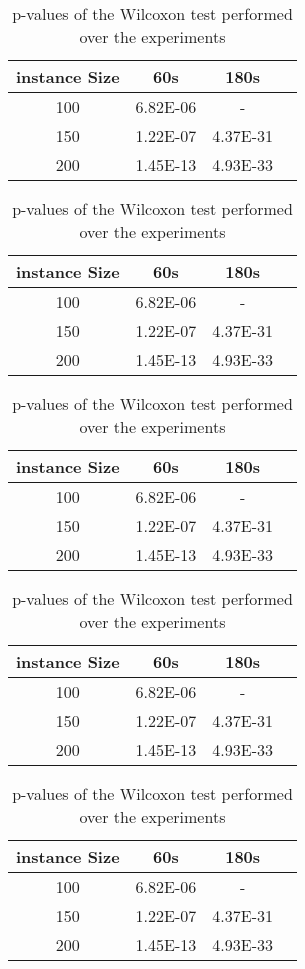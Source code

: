 \begin{table}[H]
\caption{p-values of the Wilcoxon test performed over the experiments}
\label{tab:wilcoxon}
\begin{tabular}{c ccc}
\toprule
instance Size & 60s & 180s \\
\midrule
100 & 6.82E-06 & - \\
150 & 1.22E-07 & 4.37E-31 \\
200 & 1.45E-13 & 4.93E-33 \\
\bottomrule
\end{tabular}
\end{table}
\begin{table}[H]
\caption{p-values of the Wilcoxon test performed over the experiments}
\label{tab:wilcoxon}
\begin{tabular}{c ccc}
\toprule
instance Size & 60s & 180s \\
\midrule
100 & 6.82E-06 & - \\
150 & 1.22E-07 & 4.37E-31 \\
200 & 1.45E-13 & 4.93E-33 \\
\bottomrule
\end{tabular}
\end{table}
\begin{table}[H]
\caption{p-values of the Wilcoxon test performed over the experiments}
\label{tab:wilcoxon}
\begin{tabular}{c ccc}
\toprule
instance Size & 60s & 180s \\
\midrule
100 & 6.82E-06 & - \\
150 & 1.22E-07 & 4.37E-31 \\
200 & 1.45E-13 & 4.93E-33 \\
\bottomrule
\end{tabular}
\end{table}
\begin{table}[H]
\caption{p-values of the Wilcoxon test performed over the experiments}
\label{tab:wilcoxon}
\begin{tabular}{c ccc}
\toprule
instance Size & 60s & 180s \\
\midrule
100 & 6.82E-06 & - \\
150 & 1.22E-07 & 4.37E-31 \\
200 & 1.45E-13 & 4.93E-33 \\
\bottomrule
\end{tabular}
\end{table}
\begin{table}[H]
\caption{p-values of the Wilcoxon test performed over the experiments}
\label{tab:wilcoxon}
\begin{tabular}{c ccc}
\toprule
instance Size & 60s & 180s \\
\midrule
100 & 6.82E-06 & - \\
150 & 1.22E-07 & 4.37E-31 \\
200 & 1.45E-13 & 4.93E-33 \\
\bottomrule
\end{tabular}
\end{table}
